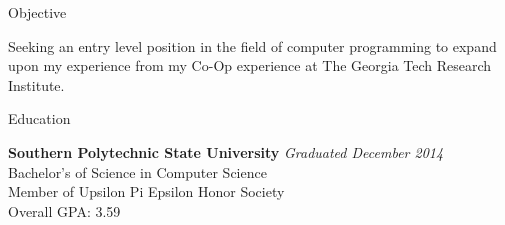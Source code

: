\documentclass[11pt]{resume} %
\begin{document}

\begin{rSection}{Objective}

Seeking an entry level position in the field of computer programming to expand upon my experience from my Co-Op experience at The Georgia Tech Research Institute.

\end{rSection}


\begin{rSection}{Education}

{\bf Southern Polytechnic State University} \hfill {\em Graduated December 2014} \\ 
Bachelor's of Science in Computer Science \\%
Member of Upsilon Pi Epsilon Honor Society\\
Overall GPA: 3.59

\end{rSection}

\end{document}
